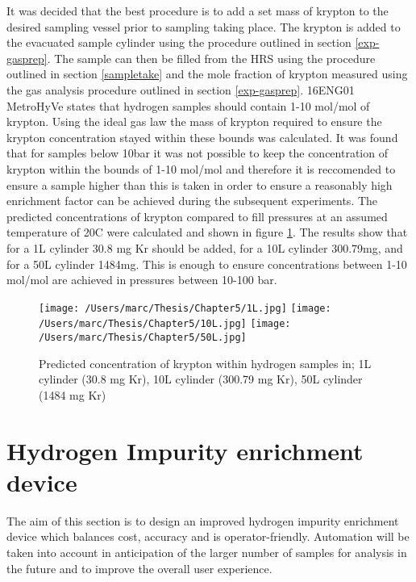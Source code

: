 It was decided that the best procedure is to add a set mass of krypton to the desired sampling vessel prior to sampling taking place. The krypton is added to the evacuated sample cylinder using the procedure outlined in section \ref{exp-gasprep}. The sample can then be filled from the HRS using the procedure outlined in section \ref{sampletake} and the mole fraction of krypton measured using the gas analysis procedure outlined in section \ref{exp-gasprep}. 16ENG01 MetroHyVe states that hydrogen samples should contain 1-10 \textmu mol/mol of krypton. Using the ideal gas law the mass of krypton required to ensure the krypton concentration stayed within these bounds was calculated. It was found that for samples below 10bar it was not possible to keep the concentration of krypton within the bounds of 1-10 \textmu mol/mol and therefore it is reccomended to ensure a sample higher than this is taken in order to ensure a reasonably high enrichment factor can be achieved during the subsequent experiments. The predicted concentrations of krypton compared to fill pressures at an assumed temperature of 20\textdegree C were calculated and shown in figure \ref{krsamples}. The results show that for a 1L cylinder 30.8 mg Kr should be added, for a 10L cylinder 300.79mg, and for a 50L cylinder 1484mg. This is enough to ensure concentrations between 1-10 \textmu mol/mol are achieved in pressures between 10-100 bar. 

\begin{figure}
    \centering
    \texttt{[image: /Users/marc/Thesis/Chapter5/1L.jpg]}
    \texttt{[image: /Users/marc/Thesis/Chapter5/10L.jpg]}
    \texttt{[image: /Users/marc/Thesis/Chapter5/50L.jpg]}
    \caption{Predicted concentration of krypton within hydrogen samples in; 1L cylinder (30.8 mg Kr), 10L cylinder (300.79 mg Kr), 50L cylinder (1484 mg Kr)}
    \label{krsamples}
  \end{figure}

\section{Hydrogen Impurity enrichment device}
The aim of this section is to design an improved hydrogen impurity enrichment device which balances cost, accuracy and is operator-friendly. Automation will be taken into account in anticipation of the larger number of samples for analysis in the future and to improve the overall user experience. 
